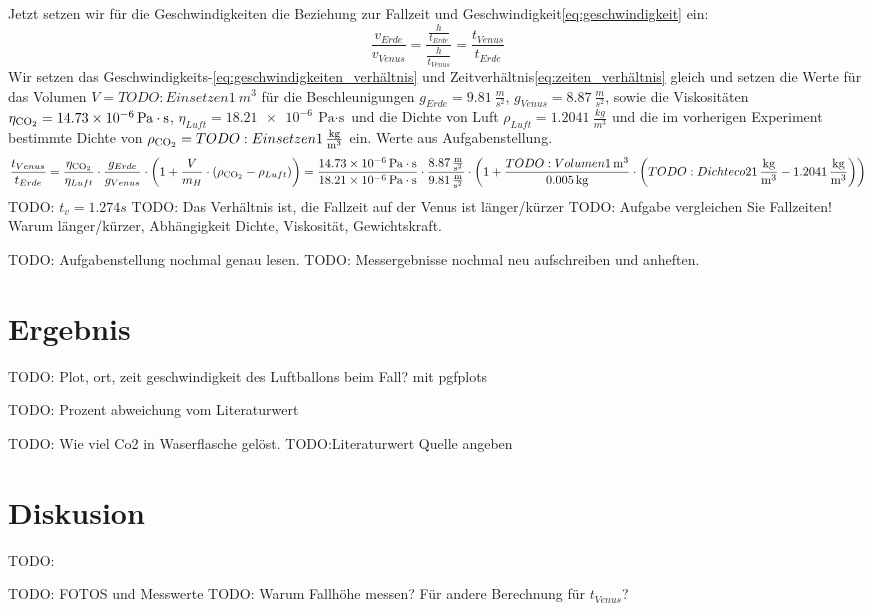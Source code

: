 \documentclass{article}
\begin{document}
        Jetzt setzen wir für die Geschwindigkeiten die Beziehung zur Fallzeit und Geschwindigkeit\ref{eq:geschwindigkeit} ein:
        \begin{equation} \label{eq:zeiten_verhältnis}
            \frac{ v_{Erde} }{ v_{Venus} } = \frac{ \frac{h}{t_{Erde}} }{ \frac{h}{t_{Venus}} } = \frac{t_{Venus}}{t_{Erde}}
        \end{equation}
        Wir setzen das Geschwindigkeits-\ref{eq:geschwindigkeiten_verhältnis} und Zeitverhältnis\ref{eq:zeiten_verhältnis} gleich und setzen die Werte
        für das Volumen \(V = TODO:Einsetzen\SI{1}{m^3}\)
        für die Beschleunigungen \(g_{Erde} = \SI{9.81}{\frac{m}{s^2}} \), \(g_{Venus} = \SI{8.87}{\frac{m}{s^2}} \),
        sowie die Viskositäten \(\eta_{\ce{CO2}} = \SI{14.73e-6}{\pascal \cdot \second} \),  \(\eta_{Luft} = \SI{18.21e-6}{\pascal \cdot \second} \) und
        die Dichte von Luft \(\rho_{Luft} = \SI{1.2041}{\frac{kg}{m^3}}\) und die im vorherigen Experiment bestimmte Dichte von  \(\rho_{\ce{CO2}} = TODO: Einsetzen\SI{1}{\frac{kg}{m^3}} \) ein.
        Werte aus Aufgabenstellung\cite{Aufgabenstellung}.
        \begin{equation}
            \frac{t_{Venus}}{t_{Erde}} = \frac{ \eta_{\ce{CO2}}}{ \eta_{Luft} } \cdot \frac{ g_{Erde} }{ g_{Venus} } \cdot \left( 1 + \frac{V}{m_H} \cdot \left( \rho_{\ce{CO2}} - \rho_{Luft} \right) \right) = 
            \frac{ \SI{14.73e-6}{\pascal \cdot \second} }{ \SI{18.21e-6}{\pascal \cdot \second} } \cdot \frac{ \SI{8.87}{\frac{m}{s^2}} }{ \SI{9.81}{\frac{m}{s^2}} } \cdot
            \left( 1 + \frac{TODO:Volumen\SI{1}{m^3}}{ \SI{0.005}{\kilogram} } \cdot \left( TODO: Dichte co2\SI{1}{\frac{kg}{m^3}} - \SI{1.2041}{\frac{kg}{m^3}} \right) \right)
        \end{equation}
        TODO: \(t_v = 1.274s\)
        TODO: Das Verhältnis ist, die Fallzeit auf der Venus ist länger/kürzer
        TODO: Aufgabe vergleichen Sie Fallzeiten! Warum länger/kürzer, Abhängigkeit Dichte, Viskosität, Gewichtskraft.

    TODO: Aufgabenstellung nochmal genau lesen.
    TODO: Messergebnisse nochmal neu aufschreiben und anheften.

    \section{Ergebnis}
        TODO: Plot, ort, zeit geschwindigkeit des Luftballons beim Fall? mit pgfplots

        TODO: Prozent abweichung vom Literaturwert

        TODO: Wie viel Co2 in Waserflasche gelöst.
        TODO:Literaturwert Quelle angeben

    \section{Diskusion}
        TODO:

    \printbibliography[title={Quellen}]

    TODO: FOTOS und Messwerte
    TODO: Warum Fallhöhe messen? Für andere Berechnung für \(t_{Venus}\)?
\end{document}
